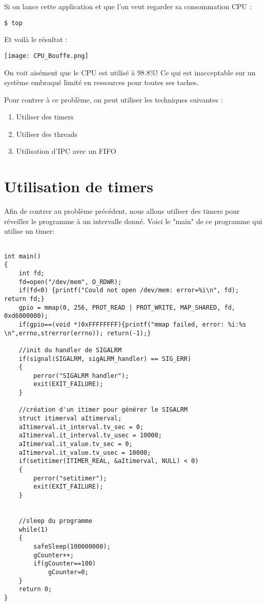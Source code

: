 Si on lance cette application et que l'on veut regarder sa consommation CPU :

\begin{lstlisting}[frame=single]
$ top
\end{lstlisting}
Et voilà le résultat :


\begin{center} 
\hspace{12.45cm}
\texttt{[image: CPU\_Bouffe.png]}
\end{center}
\vspace{1cm}

On voit aisément que le CPU est utilisé à 98.8\%! Ce qui est  inacceptable sur un système embraqué limité en ressources pour toutes ses taches.

Pour contrer à ce problème, on peut utiliser les techniques suivantes :
\begin{enumerate}
\item Utiliser des timers
\item Utiliser des threads
\item Utilisation d'IPC avec un FIFO
\end{enumerate}


\section{Utilisation de timers}

Afin de contrer au problème précédent, nous allons utiliser des timers pour réveiller le programme à un intervalle donné. Voici le "main" de ce programme qui utilise un timer:

\begin{lstlisting}[frame=single,style=C]  % Start your code-block

int main()
{
	int fd;
	fd=open("/dev/mem", O_RDWR);
	if(fd<0) {printf("Could not open /dev/mem: error=%i\n", fd); return fd;}
	gpio = mmap(0, 256, PROT_READ | PROT_WRITE, MAP_SHARED, fd, 0xd6000000);
	if(gpio==(void *)0xFFFFFFFF){printf("mmap failed, error: %i:%s \n",errno,strerror(errno)); return(-1);}

	//init du handler de SIGALRM
	if(signal(SIGALRM, sigALRM_handler) == SIG_ERR)
	{
		perror("SIGALRM handler");
		exit(EXIT_FAILURE);
	}

	//création d'un itimer pour générer le SIGALRM
	struct itimerval aItimerval;
	aItimerval.it_interval.tv_sec = 0;
	aItimerval.it_interval.tv_usec = 10000;
	aItimerval.it_value.tv_sec = 0;
	aItimerval.it_value.tv_usec = 10000;
	if(setitimer(ITIMER_REAL, &aItimerval, NULL) < 0)
	{
		perror("setitimer");
		exit(EXIT_FAILURE);
	}


	//sleep du programme
	while(1)
	{
		safeSleep(100000000);
		gCounter++;
		if(gCounter==100)
			gCounter=0;
	}
	return 0;
}
\end{lstlisting}

